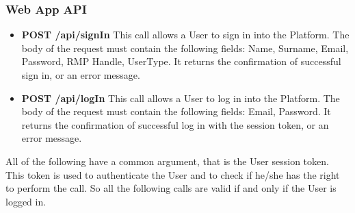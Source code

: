 \subsubsection{Web App API} \label{reff:apicalls}
\begin{itemize}
    \item \textbf{POST /api/signIn} This call allows a User to sign in into the Platform. The body of the request must contain the following fields: Name, Surname, Email, Password, RMP Handle, UserType. It returns the confirmation of successful sign in, or an error message.
    \item \textbf{POST /api/logIn} This call allows a User to log in into the Platform. The body of the request must contain the following fields: Email, Password. It returns the confirmation of successful log in with the session token, or an error message.
\end{itemize}
All of the following have a common argument, that is the User session token. This token is used to authenticate the User and to check if he/she has the right to perform the call. So all the following calls are valid if and only if the User is logged in.
